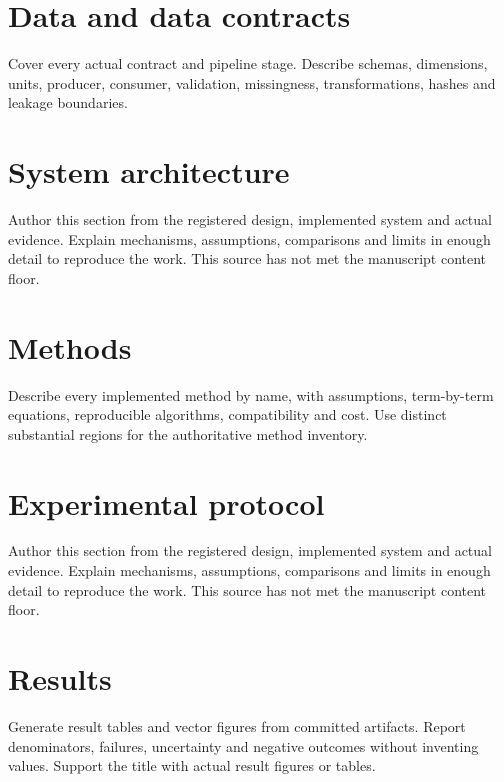 \documentclass[11pt]{article}
\begin{document}
\section{Data and data contracts}\label{sec:data-and-data-contracts}
Cover every actual contract and pipeline stage. Describe schemas, dimensions, units, producer, consumer, validation, missingness, transformations, hashes and leakage boundaries.

\section{System architecture}\label{sec:system-architecture}
Author this section from the registered design, implemented system and actual evidence. Explain mechanisms, assumptions, comparisons and limits in enough detail to reproduce the work. This source has not met the manuscript content floor.

\section{Methods}\label{sec:methods}
Describe every implemented method by name, with assumptions, term-by-term equations, reproducible algorithms, compatibility and cost. Use distinct substantial regions for the authoritative method inventory.

\section{Experimental protocol}\label{sec:experimental-protocol}
Author this section from the registered design, implemented system and actual evidence. Explain mechanisms, assumptions, comparisons and limits in enough detail to reproduce the work. This source has not met the manuscript content floor.

\section{Results}\label{sec:results}
Generate result tables and vector figures from committed artifacts. Report denominators, failures, uncertainty and negative outcomes without inventing values. Support the title with actual result figures or tables.
\end{document}
